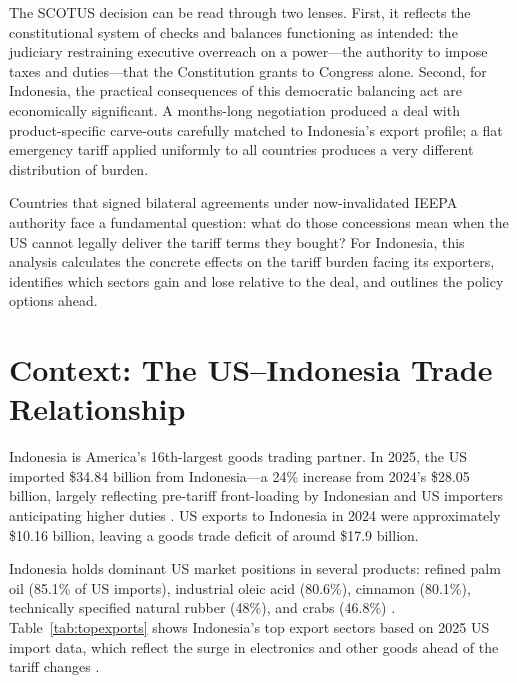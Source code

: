 \documentclass[12pt,a4paper]{article}
\begin{document}
The SCOTUS decision can be read through two lenses. First, it reflects the constitutional system of checks and balances functioning as intended: the judiciary restraining executive overreach on a power---the authority to impose taxes and duties---that the Constitution grants to Congress alone. Second, for Indonesia, the practical consequences of this democratic balancing act are economically significant. A months-long negotiation produced a deal with product-specific carve-outs carefully matched to Indonesia's export profile; a flat emergency tariff applied uniformly to all countries produces a very different distribution of burden.

Countries that signed bilateral agreements under now-invalidated IEEPA authority face a fundamental question: what do those concessions mean when the US cannot legally deliver the tariff terms they bought? For Indonesia, this analysis calculates the concrete effects on the tariff burden facing its exporters, identifies which sectors gain and lose relative to the deal, and outlines the policy options ahead.

\section{Context: The US--Indonesia Trade Relationship}

Indonesia is America's 16th-largest goods trading partner. In 2025, the US imported \$34.84 billion from Indonesia---a 24\% increase from 2024's \$28.05 billion, largely reflecting pre-tariff front-loading by Indonesian and US importers anticipating higher duties \cite{census2024,ustr2024}. US exports to Indonesia in 2024 were approximately \$10.16 billion, leaving a goods trade deficit of around \$17.9 billion.

Indonesia holds dominant US market positions in several products: refined palm oil (85.1\% of US imports), industrial oleic acid (80.6\%), cinnamon (80.1\%), technically specified natural rubber (48\%), and crabs (46.8\%) \cite{comtrade}. Table~\ref{tab:topexports} shows Indonesia's top export sectors based on 2025 US import data, which reflect the surge in electronics and other goods ahead of the tariff changes \cite{usitc_dataweb}.
\end{document}
